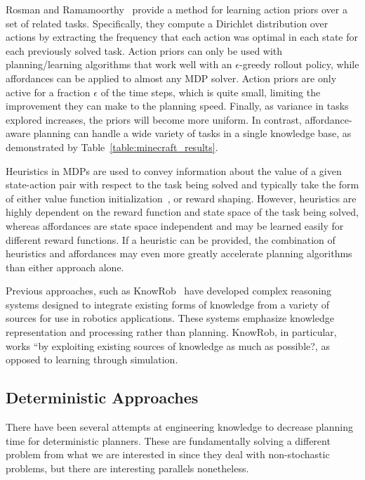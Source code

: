 \documentclass[letterpaper]{article}
\begin{document}
Rosman and Ramamoorthy~\cite{rosman2012good} provide a method for
learning action priors over a set of related tasks. Specifically, they
compute a Dirichlet distribution over actions by extracting the
frequency that each action was optimal in each state for each
previously solved task.  Action priors can only be used with
planning/learning algorithms that work well with an $\epsilon$-greedy
rollout policy, while affordances can be applied to almost any MDP
solver.  Action priors are only active for a fraction $\epsilon$ of
the time steps, which is quite small, limiting the improvement they
can make to the planning speed.  Finally, as variance in tasks
explored increases, the priors will become more uniform. In contrast,
affordance-aware planning can handle a wide variety of tasks in a
single knowledge base, as demonstrated by
Table~\ref{table:minecraft_results}.

Heuristics in MDPs are used to convey information about the value of a
given state-action pair with respect to the task being solved and
typically take the form of either value function
initialization~\citep{Hansen:1999qf}, or reward shaping\cite{potshap}.
However, heuristics are highly dependent on the reward function and
state space of the task being solved, whereas affordances are state
space independent and may be learned easily for different reward
functions. If a heuristic can be provided, the combination of
heuristics and affordances may even more greatly accelerate planning
algorithms than either approach alone.

Previous approaches, such as KnowRob~\citep{tenorth2012knowledge,tenorth2009knowrob} have developed complex reasoning systems designed to integrate existing forms of knowledge from a variety of sources for use in robotics applications. These systems emphasize knowledge representation and processing rather than planning. KnowRob, in particular, works ``by exploiting existing sources of knowledge as much as possible?, as opposed to learning through simulation.

\subsection{Deterministic Approaches}

There have been several attempts at engineering knowledge
to decrease planning time for deterministic planners. These are
fundamentally solving a different problem from what we are interested
in since they deal with non-stochastic problems, but there are
interesting parallels nonetheless.
\end{document}
